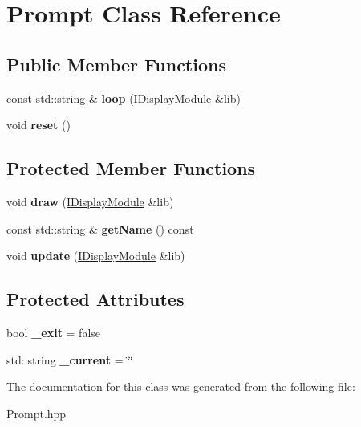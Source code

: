 \hypertarget{class_prompt}{}\section{Prompt Class Reference}
\label{class_prompt}
\subsection*{Public Member Functions}
\begin{DoxyCompactItemize}
\item 
\mbox{\label{class_prompt_a14b6361ba7552e1798b22484a1e57399}} 
const std\+::string \& {\bfseries loop} (\hyperlink{class_i_display_module}{I\+Display\+Module} \&lib)
\item 
\mbox{\label{class_prompt_a62676ee012e059d1a42cb0b42c5eebdf}} 
void {\bfseries reset} ()
\end{DoxyCompactItemize}
\subsection*{Protected Member Functions}
\begin{DoxyCompactItemize}
\item 
\mbox{\label{class_prompt_acb93a985c25fc93b230014bf94ee51f3}} 
void {\bfseries draw} (\hyperlink{class_i_display_module}{I\+Display\+Module} \&lib)
\item 
\mbox{\label{class_prompt_a4f9ef7c57c196b6b4c790740b9b63c53}} 
const std\+::string \& {\bfseries get\+Name} () const
\item 
\mbox{\label{class_prompt_aa8f8260d5d21d6984f8a03ed322a4fd4}} 
void {\bfseries update} (\hyperlink{class_i_display_module}{I\+Display\+Module} \&lib)
\end{DoxyCompactItemize}
\subsection*{Protected Attributes}
\begin{DoxyCompactItemize}
\item 
\mbox{\label{class_prompt_a8e5e294a9f5b6bec045ead06a26be3f7}} 
bool {\bfseries \+\_\+exit} = false
\item 
\mbox{\label{class_prompt_a59968c6d731b8f4af901056b0534b421}} 
std\+::string {\bfseries \+\_\+current} = \char`\"{}\char`\"{}
\end{DoxyCompactItemize}


The documentation for this class was generated from the following file\+:\begin{DoxyCompactItemize}
\item 
Prompt.\+hpp\end{DoxyCompactItemize}
